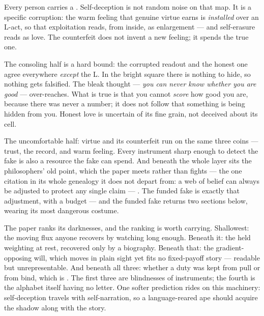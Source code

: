 \documentclass[../main_explainer]{subfiles}
\begin{document}
Every person carries a . Self-deception is not
random noise on that map. It is a specific corruption: the warm feeling that genuine
virtue earns is \emph{installed} over an L-act, so that exploitation reads, from inside,
as enlargement --- and self-erasure reads as love. The counterfeit does not invent a new
feeling; it spends the true one.

The consoling half is a hard bound: the corrupted readout and the honest one agree
everywhere \emph{except} the L. In the bright square there is nothing to hide, so
nothing gets falsified. The bleak thought --- \emph{you can never know whether you are
good} --- over-reaches. What is true is that you cannot \emph{score} how good you are,
because there was never a number; it does not follow that something is being hidden from
you. Honest love is uncertain of its fine grain, not deceived about its cell.

The uncomfortable half: virtue and its counterfeit run on the same three coins ---
trust, the record, and warm feeling. Every instrument sharp enough to detect the fake is
also a resource the fake can spend. And beneath the whole layer sits the philosophers'
old point, which the paper meets rather than fights --- the one citation in its whole
genealogy it does not depart from: a web of belief can always be adjusted to protect any
single claim --- . The funded fake is exactly that adjustment, with a
budget --- and the funded fake returns two sections below, wearing its most dangerous
costume.

The paper ranks its darknesses, and the ranking is worth carrying. Shallowest: the
moving flux anyone recovers by watching long enough. Beneath it: the held weighting at
rest, recovered only by a biography. Beneath that: the gradient-opposing will, which
moves in plain sight yet fits no fixed-payoff story --- readable but unrepresentable.
And beneath all three: whether a duty was kept from pull or from bind, which is
. The first three are blindnesses of instruments; the fourth is the alphabet
itself having no letter. One softer prediction rides on this machinery: self-deception
travels with self-narration, so a language-reared ape should acquire the shadow along
with the story.
\end{document}
